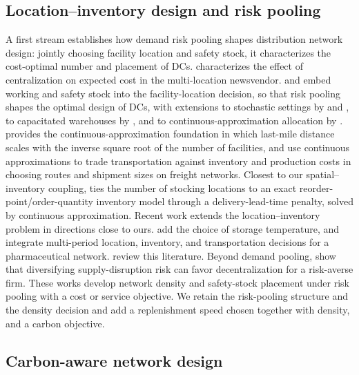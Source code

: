 \documentclass[11pt]{article}
\numberwithin{proposition}{section}
\theoremstyle{definition}
\theoremstyle{remark}
\theoremstyle{plain}
\begin{document}
\subsection{Location--inventory design and risk pooling}

A first stream establishes how demand risk pooling shapes distribution network design: jointly choosing
facility location and safety stock, it characterizes the cost-optimal number and placement of DCs. \citet{eppen1979effects} characterizes the effect of centralization on expected cost in the
multi-location newsvendor. \citet{daskin2002inventory} and \citet{shen2003joint} embed working and safety stock
into the facility-location decision, so that risk pooling shapes the optimal design of
DCs, with extensions to stochastic settings by \citet{snyder2007stochastic} and \citet{miranda2004incorporating}, to capacitated
warehouses by \citet{ozsen2008capacitated}, and to continuous-approximation allocation by
\citet{tsao2012continuous}. \citet{daganzo2005logistics} provides the continuous-approximation foundation in
which last-mile distance scales with the inverse square root of the number of facilities, and
\citet{blumenfeld1985analyzing} use continuous approximations to trade transportation against inventory and
production costs in choosing routes and shipment sizes on freight networks. Closest to our spatial--inventory
coupling, \citet{straubert2024continuous} ties the number of stocking locations to an exact
reorder-point/order-quantity inventory model through a delivery-lead-time penalty, solved by continuous
approximation. Recent work extends the location--inventory problem in directions close to ours. \citet{hu2025location} add the choice of storage temperature, and \citet{jalal2026integrated} integrate
multi-period location, inventory, and transportation decisions for a pharmaceutical network.
\citet{puttemans2025integration} review this literature. Beyond demand pooling, \citet{schmitt2015centralization} show that diversifying supply-disruption risk can
favor decentralization for a risk-averse firm. These works
develop network density and safety-stock placement under risk pooling with a cost or service objective. We retain
the risk-pooling structure and the density decision and add a replenishment speed chosen together with density,
and a carbon objective.

\subsection{Carbon-aware network design}
\end{document}
